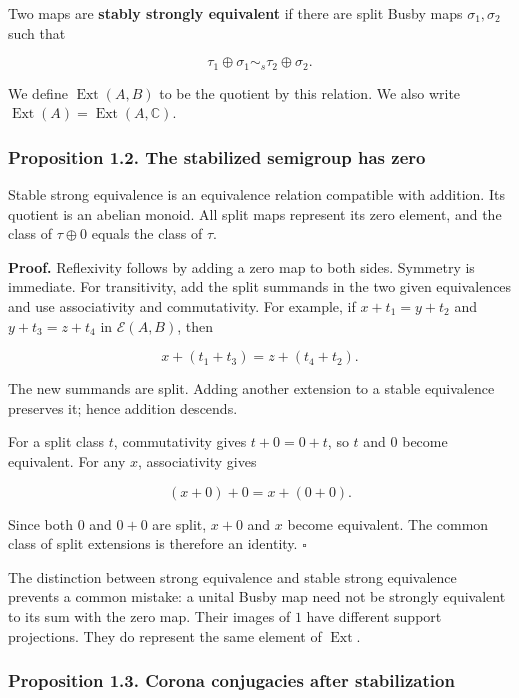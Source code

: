 \documentclass[
  11pt,
]{article}
\begin{document}
Two maps are \textbf{stably strongly equivalent} if there are split
Busby maps \(\sigma_1,\sigma_2\) such that

\[
\tau_1\oplus\sigma_1\sim_s\tau_2\oplus\sigma_2.
\]

We define \(\operatorname{Ext}(A,B)\) to be the quotient by this
relation. We also write
\(\operatorname{Ext}(A)=\operatorname{Ext}(A,\mathbb C)\).

\subsubsection{Proposition 1.2. The stabilized semigroup has
zero}\label{proposition-1.2.-the-stabilized-semigroup-has-zero}

Stable strong equivalence is an equivalence relation compatible with
addition. Its quotient is an abelian monoid. All split maps represent
its zero element, and the class of \(\tau\oplus0\) equals the class of
\(\tau\).

\textbf{Proof.} Reflexivity follows by adding a zero map to both sides.
Symmetry is immediate. For transitivity, add the split summands in the
two given equivalences and use associativity and commutativity. For
example, if \(x+t_1=y+t_2\) and \(y+t_3=z+t_4\) in \(\mathscr E(A,B)\),
then

\[
x+(t_1+t_3)=z+(t_4+t_2).
\]

The new summands are split. Adding another extension to a stable
equivalence preserves it; hence addition descends.

For a split class \(t\), commutativity gives \(t+0=0+t\), so \(t\) and
\(0\) become equivalent. For any \(x\), associativity gives

\[
(x+0)+0=x+(0+0).
\]

Since both \(0\) and \(0+0\) are split, \(x+0\) and \(x\) become
equivalent. The common class of split extensions is therefore an
identity. \(\square\)

The distinction between strong equivalence and stable strong equivalence
prevents a common mistake: a unital Busby map need not be strongly
equivalent to its sum with the zero map. Their images of \(1\) have
different support projections. They do represent the same element of
\(\operatorname{Ext}\).

\subsubsection{Proposition 1.3. Corona conjugacies after
stabilization}\label{proposition-1.3.-corona-conjugacies-after-stabilization}
\end{document}

